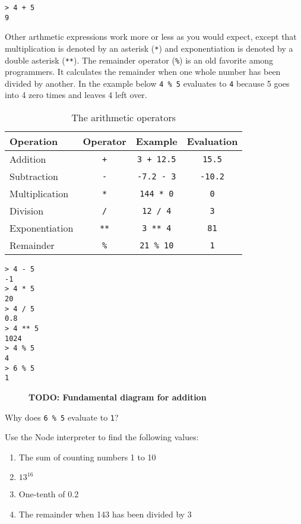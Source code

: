 \suppresslinenumbers
\begin{lstlisting}
> 4 + 5
9
\end{lstlisting}

Other arthmetic expressions work more or less as you would expect, except that
multiplication is denoted by an asterisk (\texttt{*}) and exponentiation is
denoted by a double asterisk (\texttt{**}). The remainder operator (\texttt{\%})
is an old favorite among programmers. It calculates the remainder when one whole
number has been divided by another. In the example below \texttt{4 \% 5}
evaluates to \texttt{4} because 5 goes into 4 zero times and leaves 4 left over.

\begin{table}
  \begin{tabular}{lccc}
    Operation & Operator & Example & Evaluation\\
    \hline
    Addition & \texttt{+} & \texttt{3 + 12.5} & \texttt{15.5}\\
    Subtraction & \texttt{-} & \texttt{-7.2 - 3} & \texttt{-10.2}\\
    Multiplication & \texttt{*} & \texttt{144 * 0} & \texttt{0}\\
    Division & \texttt{/} & \texttt{12 / 4} & \texttt{3}\\
    Exponentiation & \texttt{**} & \texttt{3 ** 4} & \texttt{81}\\
    Remainder & \texttt{\%} & \texttt{21 \% 10} & \texttt{1}\\
  \end{tabular}
  \caption{The arithmetic operators}
\end{table}

\begin{lstlisting}
> 4 - 5
-1
> 4 * 5
20
> 4 / 5
0.8
> 4 ** 5
1024
> 4 % 5
4
> 6 % 5
1
\end{lstlisting}

\begin{figure}
  \textbf{TODO: Fundamental diagram for addition}
\end{figure}
\begin{question}
  Why does \texttt{6 \% 5} evaluate to \texttt{1}?
\end{question}

\begin{question}
  Use the Node interpreter to find the following values:
  \begin{enumerate}
    \item The sum of counting numbers 1 to 10
    \item $13^{16}$
    \item One-tenth of 0.2
    \item The remainder when 143 has been divided by 3
  \end{enumerate}
\end{question}

